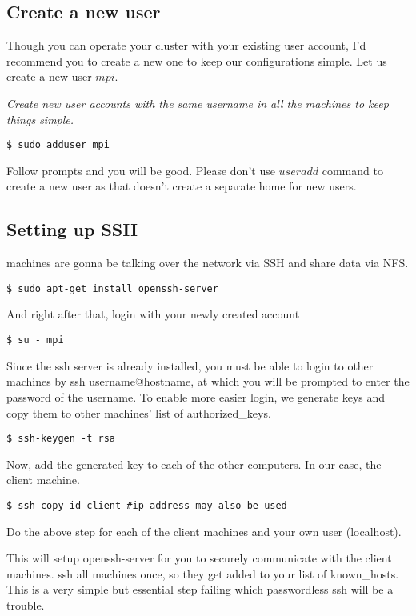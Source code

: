 \documentclass[paper=letter, fontsize=12pt]{article}
\begin{document}
\subsection{Create a new user}
Though you can operate your cluster with your existing user account, I’d recommend you to create a new one to keep our configurations simple. 
Let us create a new user $ mpi $.

\textit{Create new user accounts with the same username in all the machines to keep things simple.}

\begin{verbatim}
$ sudo adduser mpi
\end{verbatim}

Follow prompts and you will be good. Please don’t use $ useradd $ command to create a new user as that doesn’t create a separate home for new users.

\subsection{Setting up SSH}
machines are gonna be talking over the network via SSH and share data via NFS.

\begin{verbatim}
$ sudo apt­-get install openssh-server
\end{verbatim}

And right after that, login with your newly created account
\begin{verbatim}
$ su - mpi
\end{verbatim}
 
Since the ssh server is already installed, you must be able to login to other machines by ssh username@hostname, at which you will be prompted to enter the password of the username. To enable more easier login, we generate keys and copy them to other machines’ list of authorized\_keys.

\begin{verbatim}
$ ssh-keygen -t rsa
\end{verbatim}
Now, add the generated key to each of the other computers. In our case, the client machine.

\begin{verbatim}
$ ssh-copy-id client #ip-address may also be used
\end{verbatim}

Do the above step for each of the client machines and your own user (localhost).

This will setup openssh-server for you to securely communicate with the client machines. ssh all machines once, so they get added to your list of known\_hosts. This is a very simple but essential step failing which passwordless ssh will be a trouble.
\end{document}
